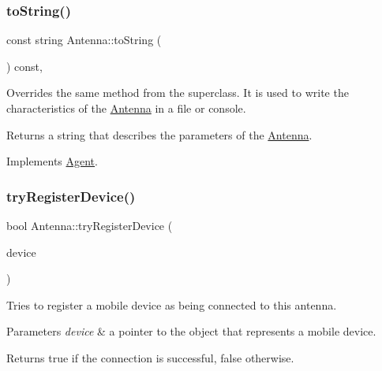 \mbox{\label{class_antenna_a7fea30e065f49a3cbcee02f60bd033c8}} 
\subsubsection{\texorpdfstring{to\+String()}{toString()}}
{\footnotesize\ttfamily const string Antenna\+::to\+String (\begin{DoxyParamCaption}{ }\end{DoxyParamCaption}) const\hspace{0.3cm}{\ttfamily [override]}, {\ttfamily [virtual]}}

Overrides the same method from the superclass. It is used to write the characteristics of the \hyperlink{class_antenna}{Antenna} in a file or console. \begin{DoxyReturn}{Returns}
a string that describes the parameters of the \hyperlink{class_antenna}{Antenna}. 
\end{DoxyReturn}


Implements \hyperlink{class_agent_a44f291596d10c7878b0641d6ec156328}{Agent}.

\mbox{\label{class_antenna_a4455f5c804e1ea520dd849dc9fd7b0b4}} 
\subsubsection{\texorpdfstring{try\+Register\+Device()}{tryRegisterDevice()}}
{\footnotesize\ttfamily bool Antenna\+::try\+Register\+Device (\begin{DoxyParamCaption}\item[{\hyperlink{class_holdable_agent}{Holdable\+Agent} $\ast$}]{device }\end{DoxyParamCaption})}

Tries to register a mobile device as being connected to this antenna. 
\begin{DoxyParams}{Parameters}
{\em device} & a pointer to the object that represents a mobile device. \\
\hline
\end{DoxyParams}
\begin{DoxyReturn}{Returns}
true if the connection is successful, false otherwise. 
\end{DoxyReturn}


